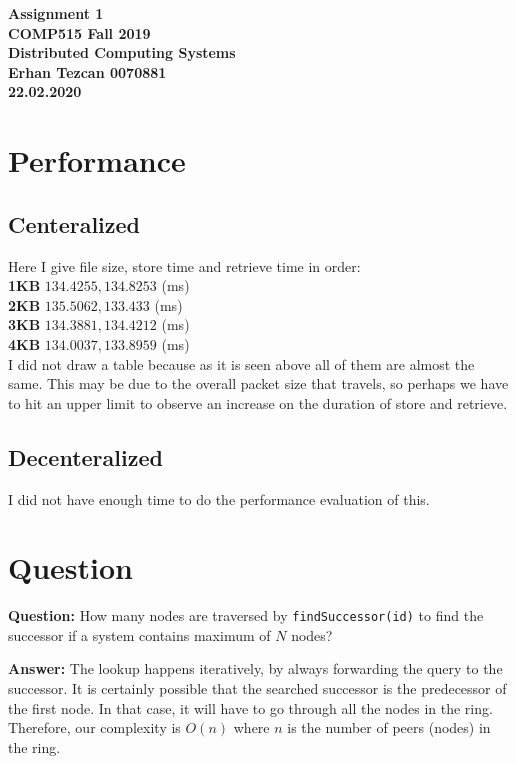 \documentclass[11pt,reqno]{amsart}
\newcommand{\code}[1]{\texttt{#1}}
\begin{document}
\begin{center}
\large\textbf{Assignment 1 \\ COMP515 Fall 2019} \\
\normalsize\textbf{Distributed Computing Systems \\  Erhan Tezcan 0070881 \\ 22.02.2020} \\
\end{center}

\section*{Performance}
\subsection*{Centeralized}

Here I give file size, store time and retrieve time in order: \\
\textbf{1KB} $134.4255,134.8253$ (ms) \\
\textbf{2KB} $135.5062,133.433$ (ms) \\
\textbf{3KB} $134.3881,134.4212$ (ms) \\
\textbf{4KB} $134.0037,133.8959$ (ms) \\

I did not draw a table because as it is seen above all of them are almost the same. This may be due to the overall packet size that travels, so perhaps we have to hit an upper limit to observe an increase on the duration of store and retrieve.

\subsection*{Decenteralized}

I did not have enough time to do the performance evaluation of this.

\section*{Question}
\textbf{Question:} How many nodes are traversed by \code{findSuccessor(id)} to find the successor if a system contains maximum of $N$ nodes?

\textbf{Answer:} The lookup happens iteratively, by always forwarding the query to the successor. It is certainly possible that the searched successor is the predecessor of the first node. In that case, it will have to go through all the nodes in the ring. Therefore, our complexity is $O(n)$ where $n$ is the number of peers (nodes) in the ring.
\end{document}
